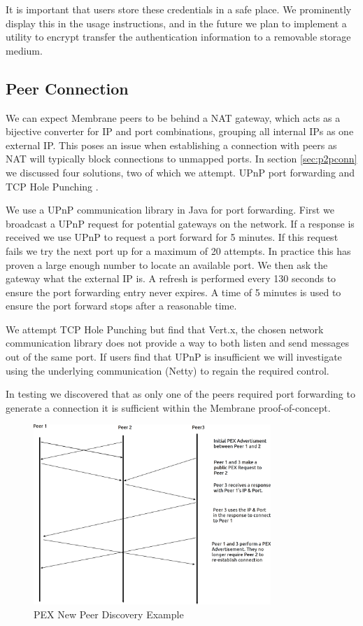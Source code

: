 \documentclass[11pt, a4paper, twocolumn, twoside]{report}
\begin{document}
It is important that users store these credentials in a safe place. We prominently display this in the usage instructions, and in the future we plan to implement a utility to encrypt transfer the authentication information to a removable storage medium.

\subsection{Peer Connection}

We can expect Membrane peers to be behind a NAT gateway, which acts as a bijective converter for IP and port combinations, grouping all internal IPs as one external IP. This poses an issue when establishing a connection with peers as NAT will typically block connections to unmapped ports. In section \ref{sec:p2pconn} we discussed four solutions, two of which we attempt. UPnP port forwarding \citep{boucadair2013universal} and TCP Hole Punching \citep{wing2010traversal}.

We use a UPnP communication library in Java for port forwarding. First we broadcast a UPnP request for potential gateways on the network. If a response is received we use UPnP to request a port forward for 5 minutes. If this request fails we try the next port up for a maximum of 20 attempts. In practice this has proven a large enough number to locate an available port. We then ask the gateway what the external IP is. A refresh is performed every 130 seconds to ensure the port forwarding entry never expires. A time of 5 minutes is used to ensure the port forward stops after a reasonable time.

We attempt TCP Hole Punching but find that Vert.x, the chosen network communication library does not provide a way to both listen and send messages out of the same port. If users find that UPnP is insufficient we will investigate using the underlying communication (Netty) to regain the required control.

In testing we discovered that as only one of the peers required port forwarding to generate a connection it is sufficient within the Membrane proof-of-concept.

\begin{figure}[!ht]
 \centering
 \includegraphics[width=0.8\textwidth]{pex-new-peer}
 \caption{PEX New Peer Discovery Example}
 \label{fig:pex-new-peer}
\end{figure}
\end{document}
